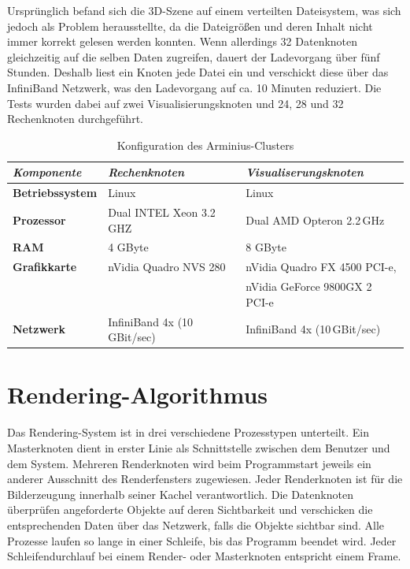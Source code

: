 Ursprünglich befand sich die 3D-Szene auf einem verteilten Dateisystem, was sich jedoch als Problem herausstellte, da die Dateigrößen und deren Inhalt nicht immer korrekt gelesen werden konnten. Wenn allerdings 32 Datenknoten gleichzeitig auf die selben Daten zugreifen, dauert der Ladevorgang über fünf Stunden. Deshalb liest ein Knoten jede Datei ein und verschickt diese über das InfiniBand Netzwerk, was den Ladevorgang auf ca. 10 Minuten reduziert. Die Tests wurden dabei auf zwei Visualisierungsknoten und 24, 28 und 32 Rechenknoten durchgeführt.

\begin{table}
 \centering
 \begin{tabular}{lll} %
  \toprule %
  \textit{Komponente} & \textit{Rechenknoten} & \textit{Visualiserungsknoten} \\
  \midrule
  \textbf{Betriebssystem} & Linux & Linux \\
  \textbf{Prozessor} & Dual INTEL Xeon 3.2\,GHZ & Dual AMD Opteron 2.2\,GHz \\
  \textbf{RAM} & 4 GByte & 8 GByte \\
  \textbf{Grafikkarte} & nVidia Quadro NVS 280 & nVidia Quadro FX 4500 PCI-e, \\
  \;&\;& nVidia GeForce 9800GX 2 PCI-e \\
  \textbf{Netzwerk} & InfiniBand 4x (10\,GBit/sec) & InfiniBand 4x (10\,GBit/sec) \\
  \bottomrule
 \end{tabular} 
 \caption{Konfiguration des Arminius-Clusters}
 \label{tab:impl:arminius}
\end{table}

\section{Rendering-Algorithmus}
\label{sec:impl:renderalgo}

Das Rendering-System ist in drei verschiedene Prozesstypen unterteilt. Ein Masterknoten dient in erster Linie als Schnittstelle zwischen dem Benutzer und dem System. Mehreren Renderknoten wird beim Programmstart jeweils ein anderer Ausschnitt des Renderfensters zugewiesen. Jeder Renderknoten ist für die Bilderzeugung innerhalb seiner Kachel verantwortlich. Die Datenknoten überprüfen angeforderte Objekte auf deren Sichtbarkeit und verschicken die entsprechenden Daten über das Netzwerk, falls die Objekte sichtbar sind. Alle Prozesse laufen so lange in einer Schleife, bis das Programm beendet wird. Jeder Schleifendurchlauf bei einem Render- oder Masterknoten entspricht einem Frame.

